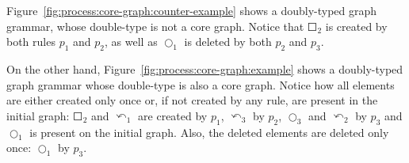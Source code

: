 \begin{example} \mbox{Figure~\ref{fig:process:core-graph:counter-example}} shows a doubly-typed graph grammar, whose double-type is not a core graph. Notice that $\Square_2$ is created by both rules $p_1$ and $p_2$, as well as $\Circle_1$ is deleted by both $p_2$ and $p_3$.

  On the other hand, Figure~\ref{fig:process:core-graph:example} shows a doubly-typed graph grammar whose double-type is also a core graph. Notice how all elements are either created only once or, if not created by any rule, are present in the initial graph: $\Square_2$ and $\curvearrowleft_1$ are created by $p_1$, $\curvearrowleft_3$ by $p_2$, $\Circle_3$ and $\curvearrowleft_2$ by $p_3$ and $\Circle_1$ is present on the initial graph. Also, the deleted elements are deleted only once: $\Circle_1$ by $p_3$.


\end{example}
